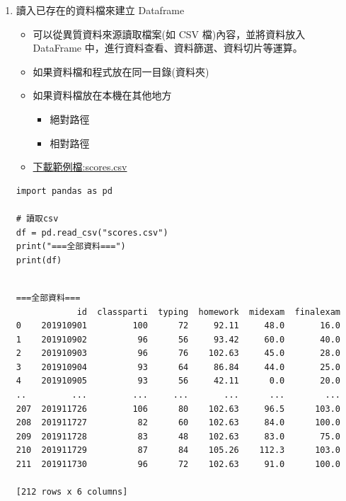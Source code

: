 \documentclass[a4paper,12pt]{article}
\begin{document}
\begin{enumerate}
\item 讀入已存在的資料檔來建立 Dataframe
\label{sec:org85b06ec}
\begin{itemize}
\item 可以從異質資料來源讀取檔案(如 CSV 檔)內容，並將資料放入 DataFrame 中，進行資料查看、資料篩選、資料切片等運算。\\
\item 如果資料檔和程式放在同一目錄(資料夾)\\
\item 如果資料檔放在本機在其他地方\\
\begin{itemize}
\item 絕對路徑\\
\item 相對路徑\\
\end{itemize}
\item \href{./scores.csv}{下載範例檔:scores.csv}\\
\end{itemize}
\lstset{breaklines=true,language=Python,label= ,caption= ,captionpos=b,firstnumber=1,numbers=left}
\begin{lstlisting}
import pandas as pd

# 讀取csv
df = pd.read_csv("scores.csv")
print("===全部資料===")
print(df)


\end{lstlisting}

\begin{verbatim}
===全部資料===
            id  classparti  typing  homework  midexam  finalexam
0    201910901         100      72     92.11     48.0       16.0
1    201910902          96      56     93.42     60.0       40.0
2    201910903          96      76    102.63     45.0       28.0
3    201910904          93      64     86.84     44.0       25.0
4    201910905          93      56     42.11      0.0       20.0
..         ...         ...     ...       ...      ...        ...
207  201911726         106      80    102.63     96.5      103.0
208  201911727          82      60    102.63     84.0      100.0
209  201911728          83      48    102.63     83.0       75.0
210  201911729          87      84    105.26    112.3      103.0
211  201911730          96      72    102.63     91.0      100.0

[212 rows x 6 columns]
\end{verbatim}
\end{enumerate}
\end{document}
